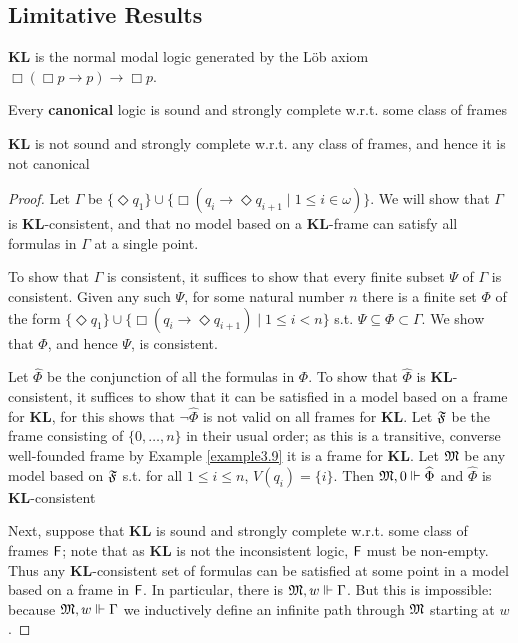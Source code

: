 \documentclass[11pt]{article}
\newcommand{\KL}{\textbf{KL}}
\begin{document}
\subsection{Limitative Results}
\label{sec:orgea6a1ab}
\(\KL\) is the normal modal logic generated by the Löb axiom \(\Box(\Box p\to
   p)\to\Box p\).

Every \textbf{canonical} logic is sound and strongly complete w.r.t. some class of frames
\begin{theorem}[]
\(\KL\) is not sound and strongly complete w.r.t. any class of frames, and
hence it is not canonical
\end{theorem}

\begin{proof}
Let \(\Gamma\) be \(\{\Diamond q_1\}\cup\{\Box(q_i\to\Diamond q_{i+1}\mid 1\le
   i\in\omega)\}\). We will show that \(\Gamma\) is \(\KL\)-consistent, and that no model
based on a \(\KL\)-frame can satisfy all formulas in \(\Gamma\) at a single point.

To show that \(\Gamma\) is consistent, it suffices to show that every finite subset \(\Psi\)
of \(\Gamma\) is consistent. Given any such \(\Psi\), for some natural number \(n\) there is
a finite set \(\Phi\) of the form \(\{\Diamond q_1\}\cup\{\Box(q_i\to\Diamond
   q_{i+1})\mid 1\le i<n\}\) s.t. \(\Psi\subseteq\Phi\subset\Gamma\). We show
that \(\Phi\), and hence \(\Psi\), is consistent.

Let \(\widehat{\Phi}\) be the conjunction of all the formulas in \(\Phi\). To show that
\(\widehat{\Phi}\) is \(\KL\)-consistent, it suffices to show that it can be
satisfied in a model based on a frame for \(\KL\), for this shows that
\(\neg\widehat{\Phi}\) is not valid on all frames for \(\KL\). Let \(\mathfrak{F}\) be
the frame consisting of \(\{0,\dots,n\}\) in their usual order; as this is a
transitive, converse well-founded frame by Example \ref{example3.9} it is a
frame for \(\KL\). Let \(\mathfrak{M}\) be any model based on \(\mathfrak{F}\) s.t. for all
\(1\le i\le n\), \(V(q_i)=\{i\}\). Then \(\mathfrak{M},0\Vdash\widehat{\Phi}\) and
\(\widehat{\Phi}\) is \(\KL\)-consistent

Next, suppose that \(\KL\) is sound and strongly complete w.r.t. some class
of frames \(\textsf{F}\); note that as \(\KL\) is not the inconsistent logic,
\(\textsf{F}\) must be non-empty. Thus any \(\KL\)-consistent set of formulas can
be satisfied at some point in a model based on a frame in \(\textsf{F}\). In
particular, there is \(\mathfrak{M},w\Vdash\Gamma\). But this is impossible: because
\(\mathfrak{M},w\Vdash\Gamma\) we inductively define an infinite path through \(\mathfrak{M}\)
starting at \(w\).
\end{proof}
\end{document}
